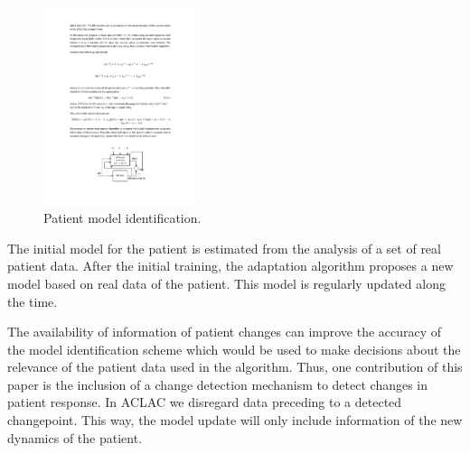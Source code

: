 \begin{figure}[htb!]
\centering
\includegraphics[width=0.4\textwidth]{./articles/pics/aclac_paper/ARXmodel.pdf}
\caption{Patient model identification.} %
\label{fig:ARXmodel}
\end{figure}

The initial model for the patient is estimated from the analysis of a set of real patient data.
%
After the initial training, the adaptation algorithm proposes a new
model based on real data of the patient. This model is regularly
updated along the time.

The availability of information of patient changes can improve the
accuracy of the model identification scheme which would be used to
make decisions about the relevance of the patient data used in the algorithm.
Thus, one contribution of this paper is the inclusion of a change
detection mechanism to detect changes in patient response.
%
In ACLAC we disregard data preceding to a detected changepoint.
This way, the model update will only include information of the new dynamics of the patient.

